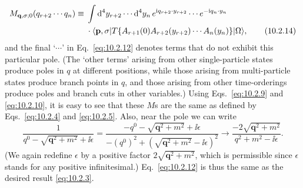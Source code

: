 \begin{align}
  M_{\mathbf q,\sigma;0}(q_{r+2}\cdots q_n)
  \equiv{}&\int \mathop{}\!\mathrm{d}^4y_{r+2}\cdots \mathop{}\!\mathrm{d}^4y_n\,
  e^{\mathrm{i} q_{r+2}\cdot y_{r+2}}\cdots e^{-\mathrm{i} q_n\cdot y_n}
  \notag\\
  &\cdot\langle \mathbf p,\sigma\rvert T\{A_{r+1}(0)A_{r+2}(y_{r+2})\cdots A_n(y_n)\}\lvert \Omega\rangle,
  \tag{10.2.14}\label{eq:10.2.14}
\end{align}
and the final `$\cdots$' in Eq.~\eqref{eq:10.2.12} denotes terms that do not exhibit this
particular pole. (The `other terms' arising from other single-particle states
produce poles in $q$ at different positions, while those arising from multi-particle
states produce branch points in $q$, and those arising from other
time-orderings produce poles and branch cuts in other variables.) Using
Eqs.~\eqref{eq:10.2.9} and \eqref{eq:10.2.10}, it is easy to see that these $M$s are the same as
defined by Eqs.~\eqref{eq:10.2.4} and \eqref{eq:10.2.5}. Also, near the pole we can write
\[
  \frac{1}{q^0-\sqrt{\mathbf q^2+m^2}+\ii\epsilon}
  =\frac{-q^0-\sqrt{\mathbf q^2+m^2}+\ii\epsilon}
  {-(q^0)^2+(\sqrt{\mathbf q^2+m^2}-\ii\epsilon)^2}
  \longrightarrow\frac{-2\sqrt{\mathbf q^2+m^2}}{q^2+m^2-\ii\epsilon}.
\]
(We again redefine $\epsilon$ by a positive factor $2\sqrt{\mathbf q^2+m^2}$, which is permissible
since $\epsilon$ stands for any positive infinitesimal.) Eq.~\eqref{eq:10.2.12} is thus the same
as the desired result \eqref{eq:10.2.3}.

